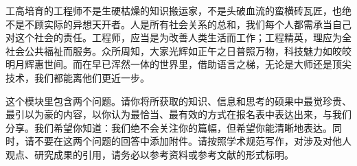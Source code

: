 \documentclass[12pt,a4paper]{article}
\begin{document}
{}
\begin{ACEEmodule}{1.4}{\xiaosihao}{\kaishu}
工高培育的工程师不是生硬枯燥的知识搬运家，不是头破血流的蛮横砖瓦匠，也绝不是不顾实际的异想天开者。人是所有社会关系的总和，我们每个人都需承当自己对这个社会的责任。工程师，应当是为改善人类生活而工作；工程精英，理应为全社会公共福祉而服务。众所周知，大家光辉如正午之日普照万物，科技魅力如皎皎明月辉惠世间。而在早已浑然一体的世界里，借助语言之梯，无论是大师还是顶尖技术，我们都能离他们更近一步。\par
这个模块里包含两个问题。请你将所获取的知识、信息和思考的硕果中最觉珍贵、最引以为豪的内容，以你认为最恰当、最有效的方式在报名表中表达出来，与我们分享。我们希望你知道：我们绝不会关注你的篇幅，但希望你能清晰地表达。同时，请不要在这两个问题的回答中添加附件。请按照学术规范写作，对涉及对他人观点、研究成果的引用，请务必以参考资料或参考文献的形式标明。\par
\end{ACEEmodule}
\end{document}
